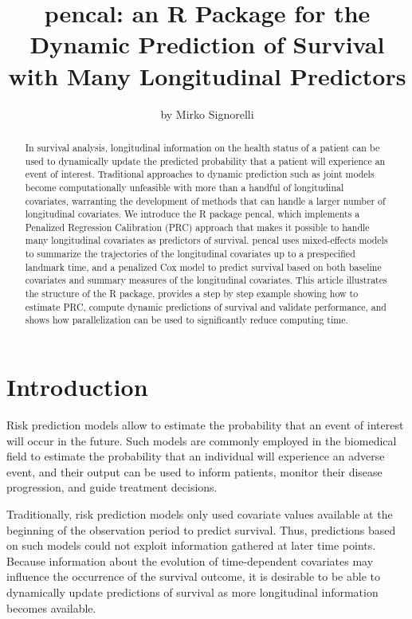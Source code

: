 \title{pencal: an R Package for the Dynamic Prediction
of Survival with Many Longitudinal Predictors}
\author{by Mirko Signorelli}

\maketitle

\begin{abstract}%
In survival analysis, longitudinal information on the health status of a
patient can be used to dynamically update the predicted probability that
a patient will experience an event of interest. Traditional approaches
to dynamic prediction such as joint models become computationally
unfeasible with more than a handful of longitudinal covariates,
warranting the development of methods that can handle a larger number of
longitudinal covariates. We introduce the R package
pencal, which implements a Penalized Regression Calibration
(PRC) approach that makes it possible to handle many longitudinal
covariates as predictors of survival. pencal uses
mixed-effects models to summarize the trajectories of the longitudinal
covariates up to a prespecified landmark time, and a penalized Cox model
to predict survival based on both baseline covariates and summary
measures of the longitudinal covariates. This article illustrates the
structure of the R package, provides a step by step example
showing how to estimate PRC, compute dynamic predictions of survival and
validate performance, and shows how parallelization can be used to
significantly reduce computing time.
\end{abstract}

\section{Introduction}\label{introduction}

Risk prediction models \citep{steyerberg2009} allow to estimate the
probability that an event of interest will occur in the future. Such
models are commonly employed in the biomedical field to estimate the
probability that an individual will experience an adverse event, and
their output can be used to inform patients, monitor their disease
progression, and guide treatment decisions.

Traditionally, risk prediction models only used covariate values
available at the beginning of the observation period to predict
survival. Thus, predictions based on such models could not exploit
information gathered at later time points. Because information about the
evolution of time-dependent covariates may influence the occurrence of
the survival outcome, it is desirable to be able to dynamically update
predictions of survival as more longitudinal information becomes
available.

